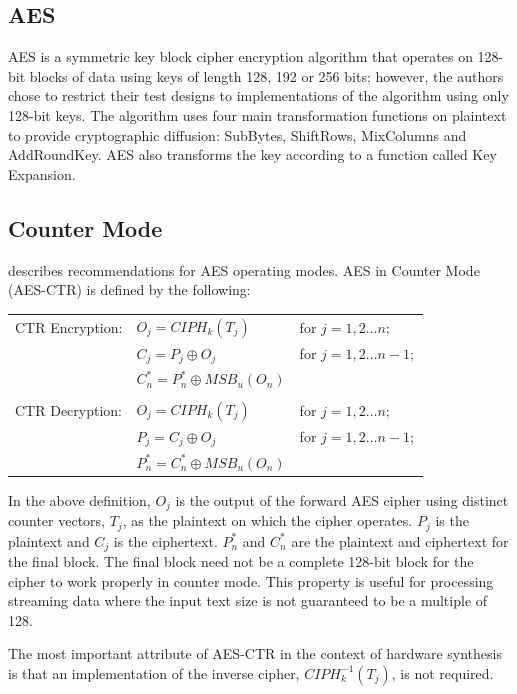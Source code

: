 \documentclass[11pt,journal,compsoc, onecolumn]{IEEEtran}
\begin{document}
\subsection{AES}
AES is a symmetric key block cipher encryption algorithm that operates on 128-bit blocks of data using keys of length 128, 192 or 256 bits; however, the authors chose to restrict their test designs to implementations of the algorithm using only 128-bit keys\cite{sel}. The algorithm uses four main transformation functions on plaintext to provide cryptographic diffusion: SubBytes, ShiftRows, MixColumns and AddRoundKey. AES also transforms the key according to a function called Key Expansion.

\subsection{Counter Mode}
\cite{14} describes recommendations for AES operating modes. AES in Counter Mode (AES-CTR) is defined by the following:

\begin{table}[h]
	\centering
	\begin{tabular}{l l l}
		CTR Encryption: & $O_j=CIPH_k(T_j)$ & for $j=1,2\dots n;$\\
		 & $C_j=P_j\oplus O_j$ & for $j=1,2\dots n-1;$\\
		 & $C^*_n=P^*_n\oplus MSB_u(O_n)$ & \\
		 \\
		CTR Decryption: & $O_j=CIPH_k(T_j)$ & for $j=1,2\dots n;$\\
		 & $P_j=C_j\oplus O_j$ & for $j=1,2\dots n-1;$\\
		 & $P^*_n=C^*_n\oplus MSB_u(O_n)$ & 
	\end{tabular}
	\label{tab:ctr}
\end{table}

In the above definition, $O_j$ is the output of the forward AES cipher using distinct counter vectors, $T_j$, as the plaintext on which the cipher operates. $P_j$ is the plaintext and $C_j$ is the ciphertext. $P^*_n$ and $C^*_n$ are the plaintext and ciphertext for the final block. The final block need not be a complete 128-bit block for the cipher to work properly in counter mode. This property is useful for processing streaming data where the input text size is not guaranteed to be a multiple of 128\cite{15}\cite{16}.

The most important attribute of AES-CTR in the context of hardware synthesis is that an implementation of the inverse cipher, $CIPH^{-1}_k(T_j)$, is not required.
\end{document}
